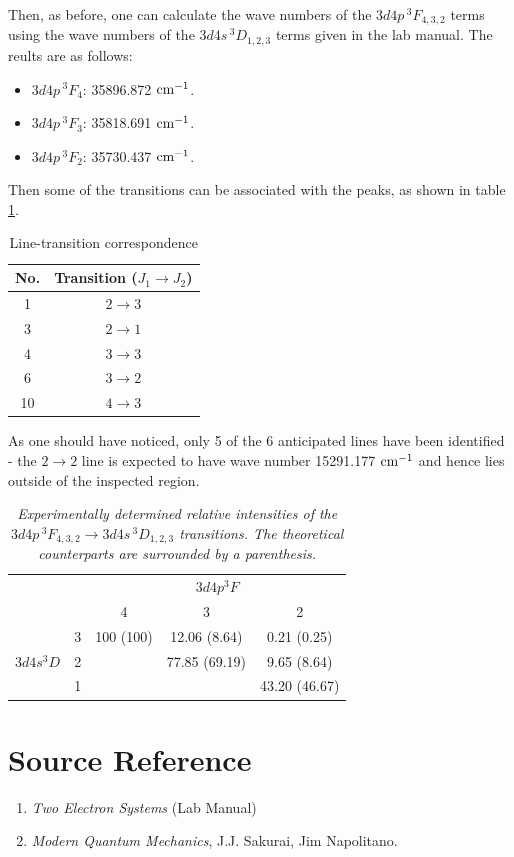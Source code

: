 \documentclass[a4paper]{article}
\begin{document}
Then, as before, one can calculate the wave numbers of the
$3d4p\,^3F_{4,3,2}$ terms using the wave numbers of the
$3d4s\,^3D_{1,2,3}$ terms given in the lab manual.  The reults are
as follows:
\begin{itemize}
\item $3d4p\,^3F_{4}$: 35896.872 $\rm cm^{-1}$.
\item $3d4p\,^3F_{3}$: 35818.691 $\rm cm^{-1}$.
\item $3d4p\,^3F_{2}$: 35730.437 $\rm cm^{-1}$.
\end{itemize}

Then some of the transitions can be associated with the peaks, as shown in table \ref{tab:line-transition2}.
\begin{table}[htb!]
\centering
\begin{tabular}{c|c}
\hline
No. & Transition ($J_1 \to J_2$)\\
\hline
1 & $2 \to 3$ \\
3 & $2 \to 1$ \\
4 & $3 \to 3$ \\
6 & $3 \to 2$\\
10 & $4 \to 3$\\
\hline
\end{tabular}
\caption{Line-transition correspondence}
\label{tab:line-transition2}
\end{table}

As one should have noticed, only 5 of the 6 anticipated lines have
been identified - the $2 \to 2$ line is expected to have wave number
15291.177 $\rm cm^{-1}$ and hence lies outside of the inspected region.

\begin{table}[htb!]
\centering
\begin{tabular}{cc|c|c|c|}
\cline{3-5}
& & \multicolumn{3}{c|}{$3d4p ^3F$}\\
\cline{3-5}
& & 4 & 3 & 2\\
\hline
\multicolumn{1}{|c|}{\multirow{3}{*}{$3d4s ^3D$}} & 3 & 100 (100) &
12.06 (8.64) & 0.21 (0.25) \\
\multicolumn{1}{|c|}{} & 2 & & 77.85 (69.19) & 9.65 (8.64)\\
\multicolumn{1}{|c|}{} & 1 & & & 43.20 (46.67) \\
\hline
\end{tabular}
\caption{\it Experimentally determined relative intensities of the
  $3d4p\,^3F_{4,3,2} \to 3d4s\,^3D_{1,2,3}$ transitions. The
  theoretical counterparts are surrounded by a parenthesis.}
\label{tab:exp-intensity2}
\end{table}


\section{Source Reference}

\begin{enumerate}
\item \textit{Two Electron Systems} (Lab Manual)
\item \textit{Modern Quantum Mechanics}, J.J. Sakurai, Jim Napolitano. 
\end{enumerate}
\end{document}
